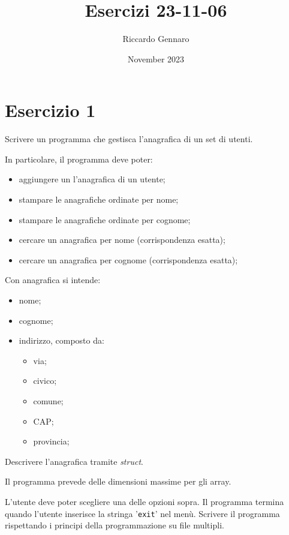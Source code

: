 \documentclass{article}
\title{Esercizi 23-11-06}
\author{Riccardo Gennaro}
\date{November 2023}
\begin{document}
\maketitle

\section*{Esercizio 1}

    Scrivere un programma che gestisca l'anagrafica di un set di utenti.

    In particolare, il programma deve poter:
    \begin{itemize}
        \item aggiungere un l'anagrafica di un utente;
        \item stampare le anagrafiche ordinate per nome;
        \item stampare le anagrafiche ordinate per cognome;
        \item cercare un anagrafica per nome (corrispondenza esatta);
        \item cercare un anagrafica per cognome (corrispondenza esatta);
    \end{itemize}

    Con anagrafica si intende:

    \begin{itemize}
        \item nome;
        \item cognome;
        \item indirizzo, composto da:
        \begin{itemize}
            \item via;
            \item civico;
            \item comune;
            \item CAP;
            \item provincia;
        \end{itemize}
    \end{itemize}

    \noindent Descrivere l'anagrafica tramite \textit{struct}.    

    \noindent Il programma prevede delle dimensioni massime per gli array.

    L'utente deve poter scegliere una delle opzioni sopra. Il programma termina quando l'utente inserisce la stringa '\texttt{exit}' nel menù.
    Scrivere il programma rispettando i principi della programmazione su file multipli. 
\end{document}
